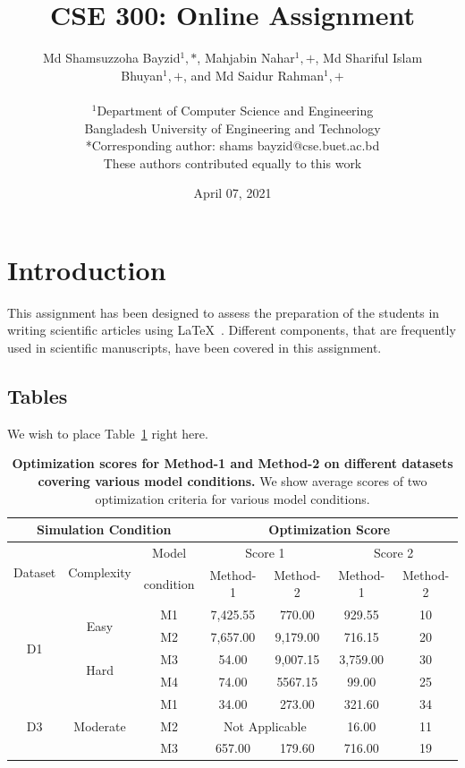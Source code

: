 \documentclass[12pt,a4paper]{article}
\title{CSE 300: Online Assignment}
\author{
	Md Shamsuzzoha Bayzid$^1,*$, Mahjabin Nahar$^1,+$, Md Shariful Islam\\ Bhuyan$^1,+$, and Md Saidur Rahman$^1,+$ \\ \\
	$^1$Department of Computer Science and Engineering \\
	Bangladesh University of Engineering and Technology \\
	*Corresponding author: shams bayzid@cse.buet.ac.bd \\
	These authors contributed equally to this work
}
\date{April 07, 2021}
\begin{document}
	\maketitle

	\section{Introduction}
	This assignment has been designed to assess the preparation of the students in writing
	scientific articles using \LaTeX\ . Different components, that are frequently used in scientific manuscripts, have been covered in this assignment.
	
	\subsection{Tables}
	We wish to place Table~\ref{Table:1} right here. \newline
	\begin{table}[h]
		\centering
		\caption{\textbf{Optimization scores for Method-1 and Method-2 on different datasets covering various model conditions.} We show average scores of two optimization criteria for various model conditions.\newline} 
		\label{Table:1}
		
		\begin{tabular}{| c | c c | c c | c c |}
			
			\hline 
			\multicolumn{3}{|c|}{Simulation Condition} & \multicolumn{4}{|c|}{Optimization Score} \\
			\hline
			\multirow{2}{*}{Dataset}  & \multirow{2}{*}{Complexity}  & Model & \multicolumn{2}{|c|}{Score 1} & \multicolumn{2}{|c|}{Score 2}  \\
			\cline{4-7}
			& & condition & Method-1 & Method-2 & Method-1 & Method-2 \\
			\hline \hline
			
			\multirow{4}{*}{D1}  & \multirow{2}{*}{Easy}  & M1 & 7,425.55 & 770.00 & 929.55 & 10 \\
			 & & M2 & 7,657.00 & 9,179.00 & 716.15 & 20 \\
			 \cline{2-7}
			 & \multirow{2}{*}{Hard}  & M3 & 54.00 & 9,007.15 & 3,759.00 & 30 \\
			 & & M4 & 74.00 & 5567.15 & 99.00 & 25 \\
			 \hline \hline
			 \multirow{3}{*}{D3} & \multirow{3}{*}{Moderate}  & M1 & 34.00 & 273.00 & 321.60 & 34 \\
			 & & M2 & \multicolumn{2}{|c|}{ Not Applicable} & 16.00 & 11 \\
			 & & M3 & 657.00 & 179.60 & 716.00 & 19 \\
			 \hline
		\end{tabular}
	\end{table}
	\pagebreak
	
\end{document}
